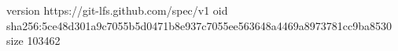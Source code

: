 version https://git-lfs.github.com/spec/v1
oid sha256:5ce48d301a9c7055b5d0471b8e937c7055ee563648a4469a8973781cc9ba8530
size 103462
